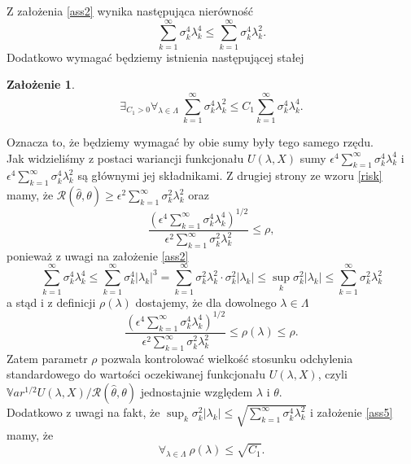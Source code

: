 \documentclass{mwart}
\newtheorem{za}{Założenie}
\begin{document}
Z założenia \ref{ass2} wynika następująca nierówność
\begin{displaymath}
\sum_{k=1}^{\infty}\sigma_k^4\lambda_k^4\leq\sum_{k=1}^{\infty}\sigma_k^4\lambda_k^2.
\end{displaymath}
Dodatkowo wymagać będziemy istnienia następującej stałej
\begin{za}
\begin{displaymath}\label{ass5}
\exists_{C_1>0}\forall_{\lambda\in \Lambda}\ \sum_{k=1}^{\infty}\sigma_k^4\lambda_k^2\leq C_1\sum_{k=1}^{\infty}\sigma_k^4\lambda_k^4.
\end{displaymath}
\end{za}
Oznacza to, że będziemy wymagać by obie sumy były tego samego rzędu.\\
Jak widzieliśmy z postaci wariancji funkcjonału $U(\lambda, X)$ sumy $\epsilon^4\sum_{k=1}^{\infty}\sigma_k^4\lambda_k^4$ i $\epsilon^4\sum_{k=1}^{\infty}\sigma_k^4\lambda_k^2$ są głównymi jej składnikami. Z drugiej strony ze wzoru \ref{risk} mamy, że $\mathcal{R}(\hat{\theta},\theta)\geq \epsilon^2\sum_{k=1}^{\infty}\sigma_k^2\lambda_k^2$ oraz 
\begin{equation}\label{rho}
\frac{\left(\epsilon^4\sum_{k=1}^{\infty}\sigma_k^4\lambda_k^4\right)^{1/2}}{\epsilon^2\sum_{k=1}^{\infty}\sigma_k^2\lambda_k^2}\leq \rho,
\end{equation}
ponieważ z uwagi na założenie \ref{ass2}
\begin{displaymath}
\sum_{k=1}^{\infty}\sigma_k^4\lambda_k^4\leq \sum_{k=1}^{\infty}\sigma_k^4|\lambda_k|^3=\sum_{k=1}^{\infty}\sigma_k^2\lambda_k^2\cdot \sigma_k^2|\lambda_k|\leq \sup_k\sigma_k^2|\lambda_k|\leq\sum_{k=1}^{\infty}\sigma_k^2\lambda_k^2
\end{displaymath}
a stąd i z definicji $\rho(\lambda)$ dostajemy, że dla dowolnego $\lambda\in \Lambda$
\begin{displaymath}
\frac{\left(\epsilon^4\sum_{k=1}^{\infty}\sigma_k^4\lambda_k^4\right)^{1/2}}{\epsilon^2\sum_{k=1}^{\infty}\sigma_k^2\lambda_k^2}\leq \rho(\lambda)\leq\rho.
\end{displaymath}
Zatem parametr $\rho$ pozwala kontrolować wielkość stosunku odchylenia standardowego do wartości oczekiwanej funkcjonału $U(\lambda,X)$, czyli $\mathbb{V}ar^{1/2}U(\lambda,X)/\mathcal{R}(\hat{\theta},\theta)$ jednostajnie względem $\lambda$ i $\theta$.\\
Dodatkowo z uwagi na fakt, że $\sup_k\sigma_k^2|\lambda_k|\leq \sqrt{\sum_{k=1}^{\infty}\sigma_k^4\lambda_k^2}$ i założenie \ref{ass5} mamy, że
\begin{displaymath}
\forall_{\lambda\in \Lambda}\ \rho(\lambda)\leq \sqrt{C_1}.
\end{displaymath}
\end{document}
